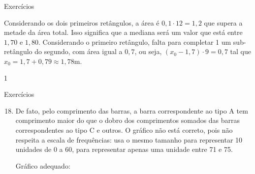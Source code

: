 {\begin{answer}{Exercícios}
{\begin{enumerate}
  Considerando os dois primeiros retângulos, a área é $0{,}1\cdot12=1{,}2$ que supera a metade da área total. Isso significa que a mediana será um valor que está entre $1{,}70$ e $1{,}80$. Considerando o primeiro retângulo, falta para completar 1 um sub-retângulo do segundo, com área igual a $0{,}7$, ou seja, $(x_0−1{,}7)\cdot9=0{,}7$ tal que $x_0=1{,}7+0{,}79\approx1{,}78$m.

  \begin{figure}[H]
  \centering
  \capstart

  \end{figure}
  \end{enumerate}
}{1}
\end{answer}
\clearmargin
\begin{answer}{Exercícios}
{\exerciselist
  \begin{enumerate}\setcounter{enumi}{17}
  \item De fato, pelo comprimento das barras, a barra correspondente ao tipo A tem comprimento maior do que o dobro dos comprimentos somados das barras correspondentes ao tipo C e outros. O gráfico não está correto, pois não respeita a escala de frequências: usa o mesmo tamanho para representar 10 unidades de 0 a 60, para representar apenas uma unidade entre 71 e 75.

  Gráfico adequado:
  \begin{figure}[H]
  \centering
  \capstart

\end{figure}
\end{enumerate}}
\end{answer}}
